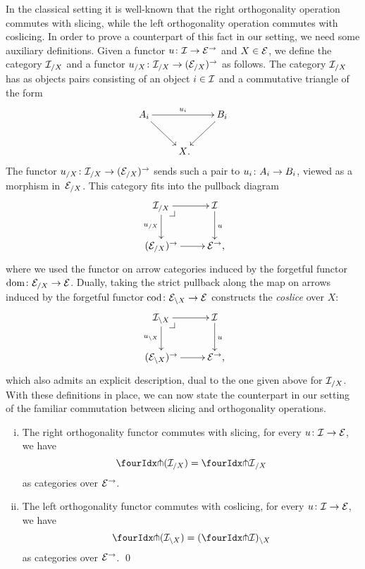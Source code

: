 \documentclass[reqno,10pt,a4paper,oneside,draft]{amsart}
\begin{document}
In the classical setting it is well-known that the right orthogonality operation commutes with slicing, while the left orthogonality operation commutes with coslicing.
In order to prove a counterpart of this fact in our setting, we need some auxiliary definitions.
Given a functor $u \co \cal{I} \to \catE^\to$ and $X \in \catE$, we define the category $\cal{I}_{/X}$ and a functor $u_{/X} \co
\cal{I}_{/X} \to (\catE_{/X})^\to$ as follows.
The category $\cal{I}_{/X}$ has as objects pairs consisting of an object $i \in \cal{I}$ and a commutative triangle of the form
\[
\xymatrix{
  A_i \ar[dr] \ar[rr]^{u_i} & & B_i \ar[dl] \\
  & X \rlap{.}
}
\]
The functor $u_{/X} \co \cal{I}_{/X} \to (\catE_{/X})^\to$ sends such a pair to $u_i \co A_i \to B_i$, viewed as a morphism in~$\catE_{/X}$.
This category fits into the pullback diagram
\[
\xymatrix{
  \cal{I}_{/X}
  \ar[r]
  \ar[d]_{u_{/X}}
  \pullback{dr}
&
  \cal{I}
  \ar[d]^{u}
\\
  (\catE_{/X})^\to
  \ar[r]
&
  \catE^\to \rlap{,}
}
\]
where we used the functor on arrow categories induced by the forgetful functor $\operatorname{dom} \co \catE_{/X} \to \catE$.
Dually, taking the strict pullback along the map on arrows induced by the forgetful functor $\operatorname{cod} \co \catE_{\backslash X} \to \catE$ constructs the \emph{coslice} over $X$:
\[
\xymatrix{
 \cal{I}_{\backslash X}
  \ar[r]
  \ar[d]_{u_{\backslash X}}
  \pullback{dr}
&
  \cal{I}
  \ar[d]^{u}
\\
  (\catE_{\backslash X})^\to
  \ar[r]
&
  \catE^\to \rlap{,}
}
\]
which also admits an explicit description, dual to the one given above for $\cal{I}_{/X}$.
With these definitions in place, we can now state the counterpart in our setting of the familiar commutation between slicing and orthogonality operations.

\begin{proposition}\label{pitchfork-slicing}
\hfill
\begin{enumerate}[(i)]
\item The right orthogonality functor commutes with slicing, \ie for every $u \co \cal{I} \to \catE$, we have
\[
  \liftr{(\cal{I}_{/X})} = {\liftr{\cal{I}}}_{/X}
\]
as categories over $\catE^\to$.
\item The left orthogonality functor commutes with coslicing, \ie for every $u \co \cal{I} \to \catE$, we have
\[
  \liftl{(\cal{I}_{\backslash X})} = (\liftl{\cal{I}})_{ \backslash X}
\]
as categories over $\catE^\to$.
\qed
\end{enumerate}
\end{proposition}
\end{document}

